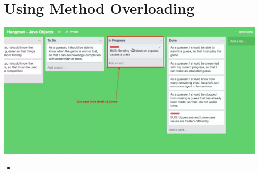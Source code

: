 \documentclass[12pt]{article}
\begin{document}
\bigskip

\section{Using Method Overloading}

\bigskip

\begin{center}
\includegraphics[width=\linewidth]{images/part_4_notes_3.png}
\end{center}

\begin{itemize}
    \item
\end{itemize}
\end{document}
